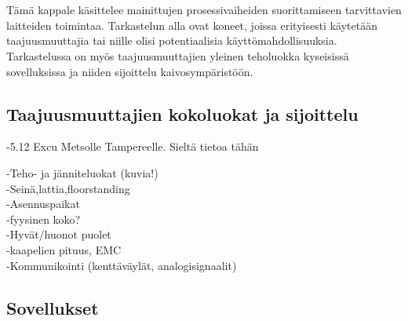\documentclass[finnish,12pt,a4paper,pdftex,elec,utf8]{aaltothesis}
\begin{document}
\\\\
Tämä kappale käsittelee mainittujen prosessivaiheiden suorittamiseen tarvittavien laitteiden toimintaa. Tarkastelun alla ovat koneet, joissa erityisesti käytetään taajuusmuuttajia tai niille olisi potentiaalisia käyttömahdollisuuksia. Tarkastelussa on myös taajuusmuuttajien yleinen teholuokka kyseisissä sovelluksissa ja niiden sijoittelu kaivosympäristöön.


\subsection{Taajuusmuuttajien kokoluokat ja sijoittelu}
-5.12 Excu Metsolle Tampereelle. Sieltä tietoa tähän

-Teho- ja jänniteluokat (kuvia!)\\
-Seinä,lattia,floorstanding\\
-Asennuspaikat\\
-fyysinen koko?\\
-Hyvät/huonot puolet\\
-kaapelien pituus, EMC\\
-Kommunikointi (kenttäväylät, analogisignaalit)\\

\subsection{Sovellukset}
\end{document}
